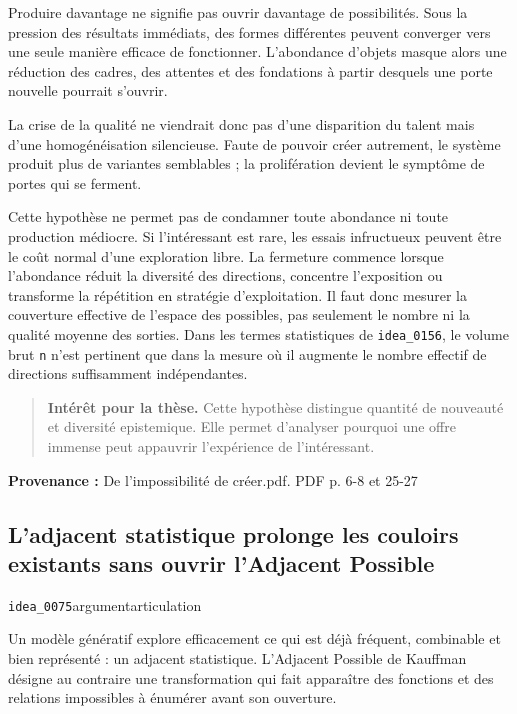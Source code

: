 \documentclass[10pt,a4paper]{article}
\begin{document}
Produire davantage ne signifie pas ouvrir davantage de possibilités. Sous la pression des résultats immédiats, des formes différentes peuvent converger vers une seule manière efficace de fonctionner. L'abondance d'objets masque alors une réduction des cadres, des attentes et des fondations à partir desquels une porte nouvelle pourrait s'ouvrir.

La crise de la qualité ne viendrait donc pas d'une disparition du talent mais d'une homogénéisation silencieuse. Faute de pouvoir créer autrement, le système produit plus de variantes semblables ; la prolifération devient le symptôme de portes qui se ferment.

Cette hypothèse ne permet pas de condamner toute abondance ni toute production médiocre. Si l'intéressant est rare, les essais infructueux peuvent être le coût normal d'une exploration libre. La fermeture commence lorsque l'abondance réduit la diversité des directions, concentre l'exposition ou transforme la répétition en stratégie d'exploitation. Il faut donc mesurer la couverture effective de l'espace des possibles, pas seulement le nombre ni la qualité moyenne des sorties. Dans les termes statistiques de \texttt{idea\_0156}, le volume brut \texttt{n} n'est pertinent que dans la mesure où il augmente le nombre effectif de directions suffisamment indépendantes.

\begin{quote}
\textbf{Intérêt pour la thèse.} Cette hypothèse distingue quantité de nouveauté et diversité epistemique. Elle permet d'analyser pourquoi une offre immense peut appauvrir l'expérience de l'intéressant.
\end{quote}
{\footnotesize\color{metadata}\textbf{Provenance :} De l'impossibilité de créer.pdf. PDF p. 6-8 et 25-27\par}

\subsection{L'adjacent statistique prolonge les couloirs existants sans ouvrir l'Adjacent Possible}
{\small\color{metadata} \texttt{idea\_0075}\quad\textbullet\quad argument\quad\textbullet\quad articulation\par}

Un modèle génératif explore efficacement ce qui est déjà fréquent, combinable et bien représenté : un adjacent statistique. L'Adjacent Possible de Kauffman désigne au contraire une transformation qui fait apparaître des fonctions et des relations impossibles à énumérer avant son ouverture.
\end{document}

